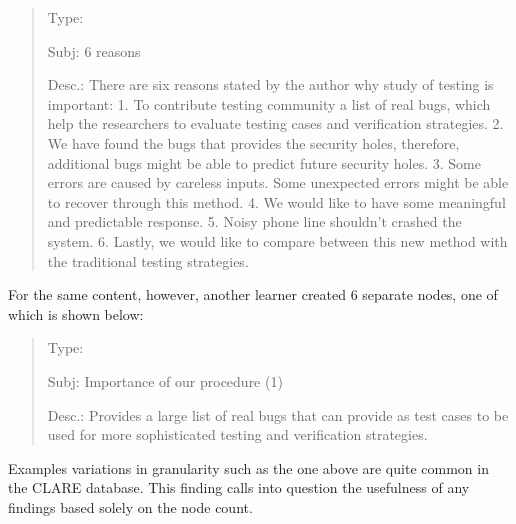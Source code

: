 \small
\begin{quote}
  \begin{itemizenoindent}

  \item {\sf Type}: 
 
\item {\sf Subj}: 6 reasons
 
\item {\sf Desc.}: There are six reasons stated by the author why study of
  testing is important: 1. To contribute testing community a list of real
  bugs, which help the researchers to evaluate testing cases and verification
  strategies.  2. We have found the bugs that provides the security holes,
  therefore, additional bugs might be able to predict future security holes.
  3. Some errors are caused by careless inputs.  Some unexpected errors might
  be able to recover through this method.  4. We would like to have some
  meaningful and predictable response.  5. Noisy phone line shouldn't crashed
  the system.  6. Lastly, we would like to compare between this new method
  with the traditional testing strategies.

 \end{itemizenoindent}
\end{quote}
\normalsize
{}

For the same content, however, another learner created 6 separate
 nodes, one of which is shown below:

\small
\begin{quote}
  \begin{itemizenoindent}

    \item {\sf Type}: 
 
    \item {\sf Subj}: Importance of our procedure (1)
 
    \item {\sf Desc.}: Provides a large list of real bugs that can provide as
      test cases to be used for more sophisticated testing and verification
      strategies.

 \end{itemizenoindent}
\end{quote}
\normalsize
{}

Examples variations in granularity such as the one above are quite common
in the CLARE database. This finding calls into question the usefulness of
any findings based solely on the node count.


